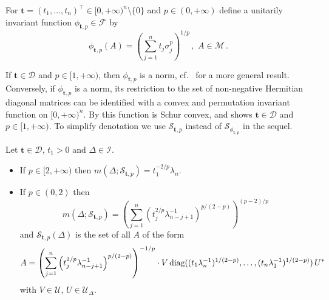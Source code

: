 \documentclass{amsart}
\begin{document}
For ${\mathbf t}=(t_1,\ldots,t_n)^\top \in [0,+\infty)^n \setminus \{ 0 \}$ and $p \in (0,+\infty)$ define a unitarily invariant function $\phi_{{\mathbf t},p} \in \mathcal F$ by
\begin{equation*} 
   \phi_{{\mathbf t},p}(A) = \left( \sum_{j=1}^n t_j\sigma_j^p \right)^{1/p} \, , \,\, A \in \mathcal M \, .
\end{equation*}

If ${\mathbf t} \in \mathcal D$ and $p \in [1,+\infty)$, then $\phi_{{\mathbf t},p}$ is a norm, cf.~\cite[Ex.~IV.1.19]{Bh} for a more general result. Conversely, if $ \phi_{{\mathbf t},p}$ is a norm, its restriction to the set of non-negative Hermitian diagonal matrices can be identified with a convex and permutation invariant function on $[0,+\infty)^n$. By \cite[3.C.2]{MOA} this function is Schur convex, and \cite[Thm.~3.A.3]{MOA} shows ${\mathbf t} \in \mathcal D$ and $p \in [1,+\infty)$. To simplify denotation we use ${\mathcal S}_{{\mathbf t},p}$ instead of  ${\mathcal S}_{\phi_{{\mathbf t},p}}$ in the sequel.

\begin{pro} \label{p4.2}
    Let ${\mathbf t} \in {\mathcal D}$, $t_1 > 0$ and $\Delta \in {\mathcal I}$. 
    \begin{itemize}
    \item[(i)] If $p \in [2,+\infty)$ then $m(\Delta ; {\mathcal S}_{{\mathbf t},p}) = t_1^{-2/p}\lambda_n$. 
    \item[(ii)] If $p \in (0,2)$ then 
            \begin{equation} \label{f4.1}
                   m(\Delta ; {\mathcal S}_{{\mathbf t},p}) = \left( \sum_{j=1}^n \left( t_j^{2/p} \lambda_{n-j+1}^{-1} \right)^{p/(2-p)} \right)^{(p-2) / p}
             \end{equation}
             and ${\mathcal S}_{{\mathbf t},p}(\Delta)$ is the set of all $A$ of the form
             \begin{equation} \label{f4.2}
                   A = \left( \sum_{j=1}^n \left(  t_j^{2/p} \lambda_{n-j+1}^{-1} \right)^{p/(2-p)} \right)^{-1/p} \cdot V \,  {\rm diag}((t_1 \lambda_n^{-1})^{1/(2-p)}, \ldots ,( t_n \lambda_1^{-1})^{1/(2-p)} ) \, U^* 
             \end{equation}
              with $V \in {\mathcal U}$, $U \in {\mathcal U}_\Delta$.
     \end{itemize}
\end{pro}
              
\end{document}

